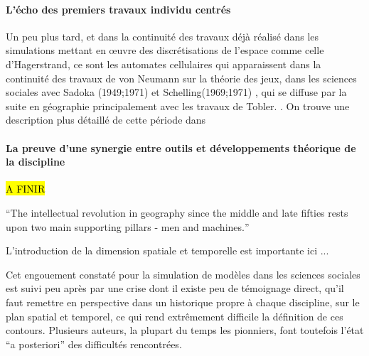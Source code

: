 
\paragraph{L'écho des premiers travaux individu centrés}

Un peu plus tard, et dans la continuité des travaux déjà réalisé dans les simulations mettant en œuvre des discrétisations de l'espace comme celle d'Hagerstrand, ce sont les automates cellulaires qui apparaissent dans la continuité des travaux de von Neumann sur la théorie des jeux, dans les sciences sociales avec Sadoka (1949;1971) et Schelling(1969;1971) \autocite{Ganguly2003}, qui se diffuse par la suite en géographie principalement avec les travaux de Tobler. \autocite{Tobler1970b} \autocite{Tobler1979}. On trouve une description plus détaillé de cette période dans \autocite{Louail2010}

\paragraph{La preuve d'une synergie entre outils et développements théorique de la discipline}

\hl{A FINIR}

\foreignquote{english}{The intellectual revolution in geography since the middle and late fifties rests upon two main supporting pillars - men and machines.}

L'introduction de la dimension spatiale et temporelle est importante ici ... 




Cet engouement constaté pour la simulation de modèles dans les sciences sociales est suivi peu après par une crise dont il existe peu de témoignage direct, qu'il faut remettre en perspective dans un historique propre à chaque discipline, sur le plan spatial et temporel, ce qui rend extrêmement difficile la définition de ces contours. Plusieurs auteurs, la plupart du temps les pionniers, font toutefois l'état \foreignquote{latin}{a posteriori} des difficultés rencontrées.

